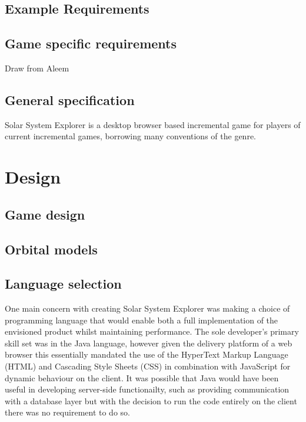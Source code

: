 \documentclass[twoside]{bhamthesis}
\begin{document}
\subsection{Example Requirements}



\subsection{Game specific requirements}
Draw from Aleem \cite{aleem_game_2016}


\subsection{General specification}

Solar System Explorer is a desktop browser based incremental game for players of current incremental games, borrowing many conventions of the genre. 


\section{Design}

\subsection{Game design}

\subsection{Orbital models}

\subsection{Language selection}

One main concern with creating Solar System Explorer was making a choice of programming language that would enable both a full implementation of the envisioned product whilst maintaining performance. The sole developer's primary skill set was in the Java language, however given the delivery platform of a web browser this essentially mandated the use of the HyperText Markup Language (HTML) and Cascading Style Sheets (CSS) in combination with JavaScript for dynamic behaviour on the client. It was possible that Java would have been useful in developing server-side functionailty, such as providing communication with a database layer but with the decision to run the code entirely on the client there was no requirement to do so.
\end{document}
